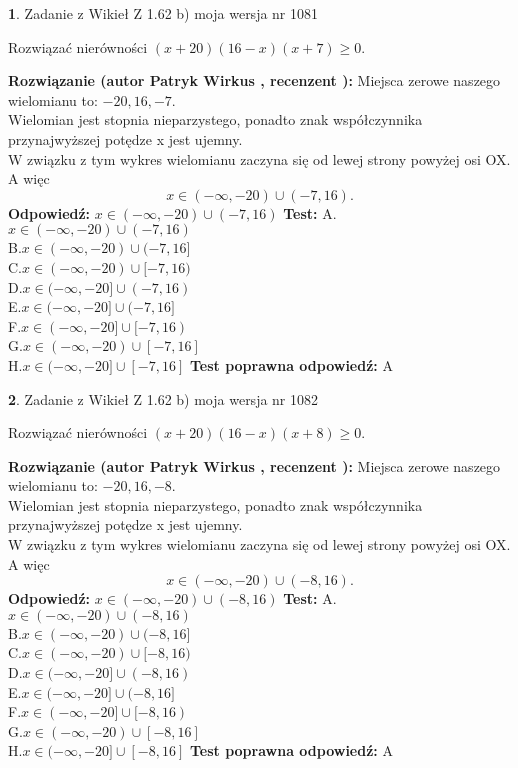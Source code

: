 \documentclass[12pt, a4paper]{article}
\theoremstyle{definition} %
\newtheorem{zad}{}
\newcommand{\zadStart}[1]{\begin{zad}#1\newline}
\newcommand{\zadStop}{\end{zad}}
\newcommand{\rozwStart}[2]{\noindent \textbf{Rozwiązanie (autor #1 , recenzent #2): }\newline}
\newcommand{\rozwStop}{\newline}
\newcommand{\odpStart}{\noindent \textbf{Odpowiedź:}\newline}
\newcommand{\odpStop}{\newline}
\newcommand{\testStart}{\noindent \textbf{Test:}\newline}
\newcommand{\testStop}{\newline}
\newcommand{\kluczStart}{\noindent \textbf{Test poprawna odpowiedź:}\newline}
\newcommand{\kluczStop}{\newline}
\begin{document}
\zadStart{Zadanie z Wikieł Z 1.62 b) moja wersja nr 1081}

Rozwiązać nierówności $(x+20)(16-x)(x+7)\ge0$.
\zadStop
\rozwStart{Patryk Wirkus}{}
Miejsca zerowe naszego wielomianu to: $-20, 16, -7$.\\
Wielomian jest stopnia nieparzystego, ponadto znak współczynnika przy\linebreak najwyższej potędze x jest ujemny.\\ W związku z tym wykres wielomianu zaczyna się od lewej strony powyżej osi OX. A więc $$x \in (-\infty,-20) \cup (-7,16).$$
\rozwStop
\odpStart
$x \in (-\infty,-20) \cup (-7,16)$
\odpStop
\testStart
A.$x \in (-\infty,-20) \cup (-7,16)$\\
B.$x \in (-\infty,-20) \cup (-7,16]$\\
C.$x \in (-\infty,-20) \cup [-7,16)$\\
D.$x \in (-\infty,-20] \cup (-7,16)$\\
E.$x \in (-\infty,-20] \cup (-7,16]$\\
F.$x \in (-\infty,-20] \cup [-7,16)$\\
G.$x \in (-\infty,-20) \cup [-7,16]$\\
H.$x \in (-\infty,-20] \cup [-7,16]$
\testStop
\kluczStart
A
\kluczStop



\zadStart{Zadanie z Wikieł Z 1.62 b) moja wersja nr 1082}

Rozwiązać nierówności $(x+20)(16-x)(x+8)\ge0$.
\zadStop
\rozwStart{Patryk Wirkus}{}
Miejsca zerowe naszego wielomianu to: $-20, 16, -8$.\\
Wielomian jest stopnia nieparzystego, ponadto znak współczynnika przy\linebreak najwyższej potędze x jest ujemny.\\ W związku z tym wykres wielomianu zaczyna się od lewej strony powyżej osi OX. A więc $$x \in (-\infty,-20) \cup (-8,16).$$
\rozwStop
\odpStart
$x \in (-\infty,-20) \cup (-8,16)$
\odpStop
\testStart
A.$x \in (-\infty,-20) \cup (-8,16)$\\
B.$x \in (-\infty,-20) \cup (-8,16]$\\
C.$x \in (-\infty,-20) \cup [-8,16)$\\
D.$x \in (-\infty,-20] \cup (-8,16)$\\
E.$x \in (-\infty,-20] \cup (-8,16]$\\
F.$x \in (-\infty,-20] \cup [-8,16)$\\
G.$x \in (-\infty,-20) \cup [-8,16]$\\
H.$x \in (-\infty,-20] \cup [-8,16]$
\testStop
\kluczStart
A
\kluczStop
\end{document}
